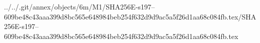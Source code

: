 ../../.git/annex/objects/6m/M1/SHA256E-s197--609be48c43aaa399d8bc565e648984beb254f632d9d9ac5a5f26d1aa68c084fb.tex/SHA256E-s197--609be48c43aaa399d8bc565e648984beb254f632d9d9ac5a5f26d1aa68c084fb.tex